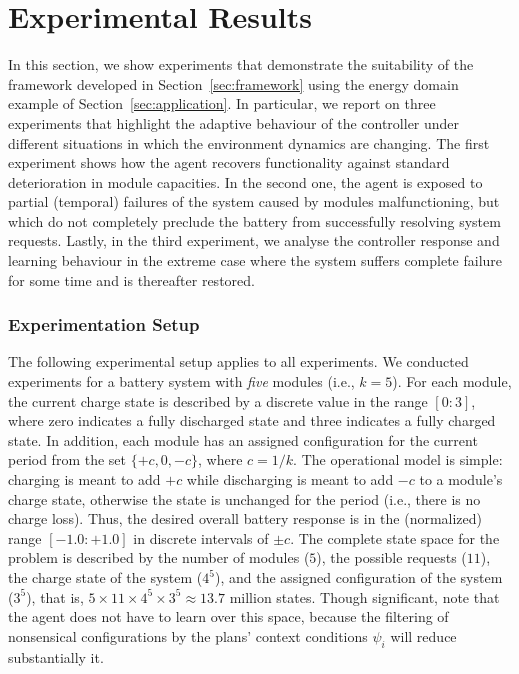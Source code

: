 
\section{Experimental Results}\label{sec:results}

In this section, we show experiments that demonstrate the suitability of the framework developed in Section~\ref{sec:framework} using the energy domain example of Section~\ref{sec:application}. In particular, we report on three experiments that highlight the adaptive behaviour of the controller under different situations in which the environment dynamics are changing. 
The first experiment shows how the agent recovers functionality against standard deterioration in module capacities. In the second one, the agent is exposed to partial (temporal) failures of the system caused by modules malfunctioning, but which do not completely preclude the battery from successfully resolving system requests. Lastly, in the third experiment, we analyse the controller response and learning behaviour in the extreme case where the system suffers complete failure for some time and is thereafter restored.



\subsubsection{Experimentation Setup}

The following experimental setup applies to all experiments. 
We conducted experiments for a battery system with \emph{five} modules (i.e., $k=5$). For each module, the current charge state is described by a discrete value in the range $[0:3]$, where zero indicates a fully discharged state and three indicates a fully charged state. In addition, each module has an assigned configuration for the current period from the set $\{+c, 0, -c\}$, where $c=1/k$. The operational model is simple: charging is meant to add $+c$ while discharging is meant to add $-c$ to a module's charge state, otherwise the state is unchanged for the period (i.e., there is no charge loss).
Thus, the desired overall battery response is in the (normalized) range $[-1.0:+1.0]$ in discrete intervals of $\pm c$. 
The complete state space for the problem is described by the number of modules ($5$), the possible requests ($11$), the charge state of the system ($4^5$), and the assigned configuration of the system ($3^5$), that is, $5 \times 11 \times 4^5 \times 3^5 \approx 13.7$ million states. Though significant, note that the agent does not have to learn over this space, because the filtering of nonsensical configurations by the plans' context conditions $\psi_i$ will reduce substantially it.




